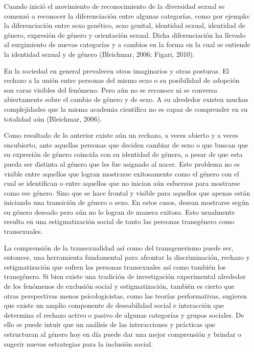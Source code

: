Cuando inició el movimiento de reconocimiento de la diversidad sexual se
comenzó a reconocer la diferenciación entre algunas categorías, como por
ejemplo: la diferenciación entre sexo genético, sexo genital, identidad
sexual, identidad de género, expresión de género y orientación sexual.
Dicha diferenciación ha llevado al surgimiento de nuevas categorías y a
cambios en la forma en la cual se entiende la identidad sexual y de género
(Bleichmar, 2006; Figari, 2010).

En la sociedad en general prevalecen otros imaginarios y otras posturas.
El rechazo a la unión entre personas del mismo sexo o su posibilidad de adopción
son caras visibles del fenómeno.
Pero aún no se reconoce ni se conversa abiertamente sobre el cambio de género y
de sexo.
A su alrededor existen muchas complejidades que la misma academia científica no
es capaz de comprender en su totalidad aún (Bleichmar, 2006).

Como resultado de lo anterior existe aún un rechazo, a veces abierto y a veces
encubierto, ante aquellas personas que deciden cambiar de sexo o que buscan que
su expresión de género coincida con su identidad de género, a pesar de que esta
pueda ser distinta al género que les fue asignado al nacer.
Este problema no es visible entre aquellos que logran mostrarse exitosamente
como el género con el cual se identifican o entre aquellos que no inician aún
esfuerzos para mostrarse como ese género.
Sino que se hace frontal y visible para aquellos que apenas están iniciando una
transición de género o sexo.
En estos casos, desean mostrarse según su género deseado pero aún no lo logran
de manera exitosa.
Esto usualmente resulta en una estigmatización social de tanto las personas
transgénero como transexuales.

La comprensión de la transexualidad así como del transgenerismo puede ser,
entonces, una herramienta fundamental para afrontar la discriminación, rechazo y
estigmatización que sufren las personas transexuales así como también los
transgénero.
Si bien existe una tradición de investigación experimental alrededor de los
fenómenos de exclusión social y estigmatización, también es cierto que otras
perspectivas menos psicologicistas, como las teorías performativas, sugieren que
existe un amplio componente de deseabilidad social e interacción que determina
el rechazo activo o pasivo de algunas categorías y grupos sociales.
De ello se puede intuir que un análisis de las interacciones y prácticas que
estructuran al género hoy en día puede dar una mejor comprensión y brindar o
sugerir nuevas estrategias para la inclusión social.

